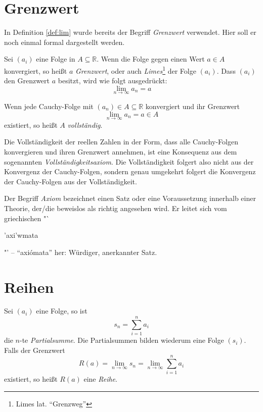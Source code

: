 \section{Grenzwert}

In Definition \ref{def:lim} wurde bereits der Begriff \textsl{Grenzwert} verwendet. Hier soll er noch einmal formal dargestellt werden. 

\begin{definition}
Sei $(a_i)$ eine Folge in $A\subseteq \mathbb{R}$. Wenn die Folge gegen einen Wert $a\in A$ konvergiert, so heißt $a$ \textsl{Grenzwert}, oder auch \textsl{Limes}\footnote{Limes lat. "`Grenzweg"'} der Folge $(a_i)$. Dass $(a_i)$ den Grenzwert $a$ besitzt, wird wie folgt ausgedrückt:
\[
\lim_{n\rightarrow \infty} a_n = a
\]
\end{definition}

\begin{definition}\label{def:voll}
Wenn jede Cauchy-Folge mit $(a_n)\in A\subseteq \mathbb{R}$ konvergiert und ihr Grenzwert 
\[\lim_{n\rightarrow \infty} a_n = a\in A\] 
existiert, so heißt $A$ \textsl{vollständig}. 

Die Vollständigkeit der reellen Zahlen in der Form, dass alle Cauchy-Folgen konvergieren und ihren Grenzwert annehmen, ist eine Konsequenz aus dem sogenannten \textsl{Vollständigkeitsaxiom}. Die Vollständigkeit folgert also nicht aus der Konvergenz der Cauchy-Folgen, sondern genau umgekehrt folgert die Konvergenz der Cauchy-Folgen aus der Vollständigkeit. 
\end{definition}


Der Begriff \textsl{Axiom} bezeichnet einen Satz oder eine Voraussetzung innerhalb einer Theorie, der/die beweislos als richtig angesehen wird. Er leitet sich vom griechischen "`\begin{greek}'axi'wmata\end{greek}"' -- "`axi\'omata"' her: Würdiger, anerkannter Satz.

\section{Reihen}

\begin{definition}
Sei $(a_i)$ eine Folge, so ist 
\[
s_n = \sum_{i=1}^{n} a_i
\]
die $n$-te \textsl{Partialsumme}. Die Partialsummen bilden wiederum eine Folge $(s_i)$. Falls der Grenzwert 
\[
R(a) = \lim_{n\rightarrow \infty} s_n = \lim_{n\rightarrow \infty} \sum_{i=1}^{n} a_i
\]
existiert, so heißt $R(a)$ eine \textsl{Reihe}.
\end{definition}

